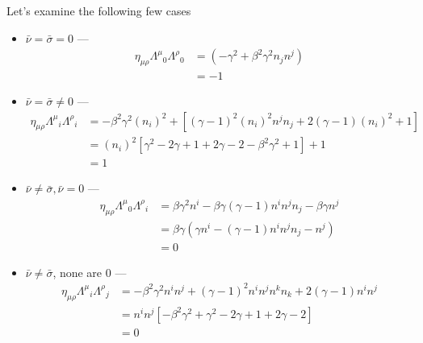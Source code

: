 \documentclass[12pt]{report}
\begin{document}
\begin{description}
        Let's examine the following few cases
        \begin{itemize}
            \item $\bar{\nu} = \bar{\sigma} = 0$ ---
                \begin{align*}
                    \eta_{\mu\rho}{\Lambda^\mu}_0{\Lambda^\rho}_0 &=
                        (-\gamma^2 + \beta^2\gamma^2n_jn^j) \\
                        &= -1
                \end{align*}
            \item $\bar{\nu} = \bar{\sigma} \neq 0$ ---
                \begin{align*}
                    \eta_{\mu\rho}{\Lambda^\mu}_i{\Lambda^\rho}_i &=
                        -\beta^2\gamma^2(n_i)^2 + \left[
                            (\gamma-1)^2(n_i)^2n^jn_j + 2(\gamma - 1)(n_i)^2 + 1
                        \right]\\
                    &= (n_i)^2\left[ \gamma^2 - 2\gamma + 1 + 2\gamma - 2 -
                        \beta^2\gamma^2  + 1\right] + 1\\
                    &= 1
                \end{align*}
            \item $\bar{\nu} \neq \bar{\sigma}, \bar{\nu} = 0$ ---
                \begin{align*}
                    \eta_{\mu\rho}{\Lambda^\mu}_0{\Lambda^\rho}_i &=
                        \beta\gamma^2 n^i - \beta\gamma(\gamma-1)n^in^jn_j -
                        \beta \gamma n^j\\
                        &= \beta\gamma(\gamma n^i - (\gamma-1)n^in^jn_j - n^j)\\
                        &= 0
                \end{align*}
            \item $\bar{\nu} \neq \bar{\sigma}$, none are $0$ ---
                \begin{align*}
                    \eta_{\mu\rho}{\Lambda^\mu}_i{\Lambda^\rho}_j &=
                        -\beta^2\gamma^2n^in^j + (\gamma - 1)^2n^in^jn^kn_k +
                        2(\gamma - 1)n^in^j\\
                        &= n^in^j\left[ -\beta^2\gamma^2 + \gamma^2 - 2\gamma +
                            1 + 2\gamma - 2 \right]\\
                        &= 0
                \end{align*}
        \end{itemize}


\end{description}
\end{document}
